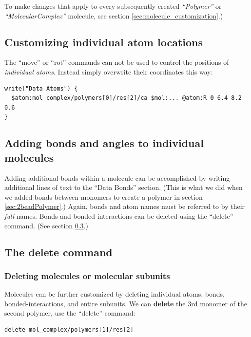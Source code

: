 \documentclass[11pt]{article}
\begin{document}
To make changes that apply to every subsequently created \textit{``Polymer''}
or \textit{``MolecularComplex''} molecule,
see section \ref{sec:molecule_customization}.)


\subsection{Customizing individual atom locations}
\label{sec:custom_atom}
The ``move'' or ``rot'' commands can not be used to control the positions
of \textit{individual atoms}.
Instead simply overwrite their coordinates this way:
\begin{verbatim}
write("Data Atoms") {
  $atom:mol_complex/polymers[0]/res[2]/ca $mol:... @atom:R 0 6.4 8.2 0.6
}
\end{verbatim}

\subsection{Adding bonds and angles to individual molecules}
\label{sec:adding_atoms_bonds}
Adding additional bonds within a molecule can be accomplished
by writing additional lines of text to the ``Data Bonds'' section.
(This is what we did when we added bonds between monomers to create a polymer
 in section \ref{sec:2beadPolymer}.)
Again, bonds and atom names must be referred to by their \textit{full} names.
Bonds and bonded interactions can be deleted using the ``delete'' command.
(See section \ref{sec:delete}.)


\subsection{The \textbf{delete} command}
\label{sec:delete}

\subsubsection{Deleting molecules or molecular subunits}
Molecules can be further customized by deleting 
individual atoms, bonds, bonded-interactions, and entire subunits.
We can \textbf{delete} the 3rd monomer of the second polymer, 
use the ``delete'' command:
\begin{verbatim}
delete mol_complex/polymers[1]/res[2]
\end{verbatim}
\end{document}
